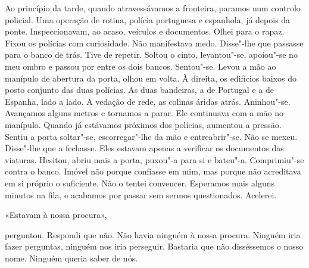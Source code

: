 Ao princípio da tarde, quando atravessávamos a fronteira, paramos num
controlo policial. Uma operação de rotina, polícia portuguesa e
espanhola, já depois da ponte. Inspeccionavam, ao acaso, veículos e
documentos. Olhei para o rapaz. Fixou os polícias com curiosidade. Não
manifestava medo. Disse"-lhe que passasse para o banco de trás. Tive de
repetir. Soltou o cinto, levantou"-se, apoiou"-se no meu ombro e passou
por entre os dois bancos. Sentou"-se. Levou a mão ao manípulo de
abertura da porta, olhou em volta. À direita, os edifícios baixos do
posto conjunto das duas polícias. As duas bandeiras, a de Portugal e a
de Espanha, lado a lado. A vedação de rede, as colinas áridas atrás.
Aninhou"-se. Avançamos alguns metros e tornamos a parar. Ele continuava
com a mão no manípulo. Quando já estávamos próximos dos polícias,
aumentou a pressão. Sentiu a porta soltar"-se, escorregar"-lhe da mão e
entreabrir"-se. Não se mexeu. Disse"-lhe que a fechasse. Eles estavam
apenas a verificar os documentos das viaturas. Hesitou, abriu mais a
porta, puxou"-a para si e bateu"-a. Comprimiu"-se contra o banco. Imóvel
não porque confiasse em mim, mas porque não acreditava em si próprio o
suficiente. Não o tentei convencer. Esperamos mais alguns minutos na
fila, e acabamos por passar sem sermos questionados. Acelerei.

«Estavam à nossa procura»,

perguntou. Respondi que não. Não havia ninguém à nossa procura. Ninguém
iria fazer perguntas, ninguém nos iria perseguir. Bastaria que não
disséssemos o nosso nome. Ninguém queria saber de nós.

